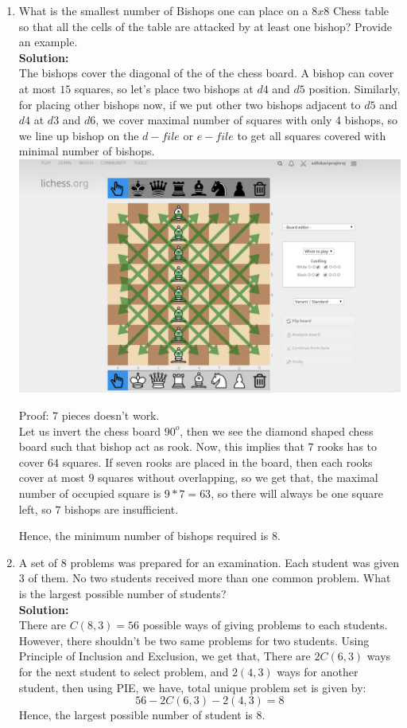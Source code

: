 \documentclass{article}
\begin{document}
\begin{enumerate}
\item  What is the smallest number of Bishops one can place on a $8 x 8$ Chess table so that all the cells of the table are attacked by at least one bishop? Provide an example.\\
\textbf{Solution:}\\
The bishops cover the diagonal of the of the chess board. A bishop can cover at most $15$ squares, so let's place two bishops at $d4$ and $d5$ position. Similarly, for placing other bishops now, if we put other two bishops adjacent to $d5$ and $d4$ at $d3$ and $d6$, we cover maximal number of squares with only 4 bishops, so we line up bishop on the $d-file$ or $e-file$ to get all squares covered with minimal number of bishops.
\includegraphics[width=\textwidth]{chess.PNG}

Proof: $7$ pieces doesn't work.\\
Let us invert the chess board $90^o$, then we see the diamond shaped chess board such that bishop act as rook. Now, this implies that $7$ rooks has to cover $64$ squares. If seven rooks are placed in the board, then each rooks cover at most $9$ squares without overlapping, so we get that, the maximal number of occupied square is $9*7=63$, so there will always be one square left, so $7$ bishops are insufficient.

Hence, the minimum number of bishops required is $\boxed{8}.$


\newpage

\item  A set of 8 problems was prepared for an examination. Each student was given 3 of them. No two students received more than one common problem. What is the largest possible number of students?\\
\textbf{Solution:}\\
There are $C(8,3)=56$ possible ways of giving problems to each students. However, there shouldn't be two same problems for two students.
Using Principle of Inclusion and Exclusion, we get that,
There are $2C(6,3)$ ways for the next student to select problem, and $2(4,3)$ ways for another student, then using PIE, we have, total unique problem set is given by:
$$56-2C(6,3)-2(4,3)=8$$
Hence, the largest possible number of student is $\boxed{8}$.


\end{enumerate}
\end{document}
